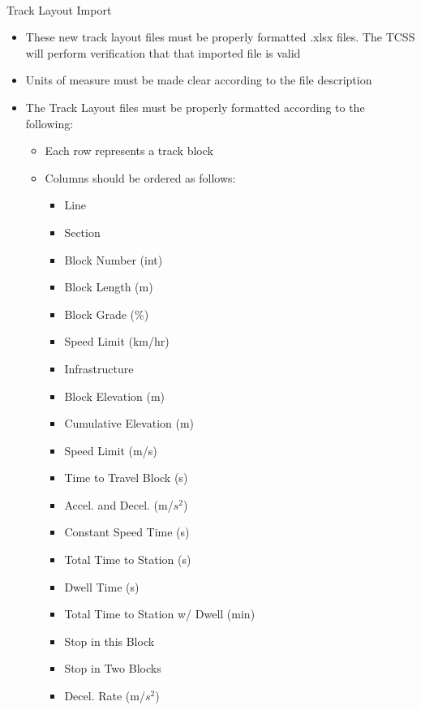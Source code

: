 \documentclass{article}
\begin{document}
    \paragraph{}
    Track Layout Import
    \begin{itemize}
        \item These new track layout files must be properly formatted .xlsx files. The TCSS will perform verification that that imported file is valid
        \item Units of measure must be made clear according to the file description
        \item The Track Layout files must be properly formatted according to the following:
        \begin{itemize}
            \item Each row represents a track block
            \item Columns should be ordered as follows:
            \begin{itemize}
                \item Line
                \item Section
                \item Block Number (int)
                \item Block Length (m)
                \item Block Grade (\%)
                \item Speed Limit (km/hr)
                \item Infrastructure
                \item Block Elevation (m)
                \item Cumulative Elevation (m)
                \item Speed Limit (m/s)
                \item Time to Travel Block (s)
                \item Accel. and Decel. (m/$s^{2}$)
                \item Constant Speed Time (s)
                \item Total Time to Station (s)
                \item Dwell Time (s)
                \item Total Time to Station w/ Dwell (min)
                \item Stop in this Block
                \item Stop in Two Blocks
                \item Decel. Rate (m/$s^{2}$)

\end{itemize}
\end{itemize}
\end{itemize}
\end{document}
